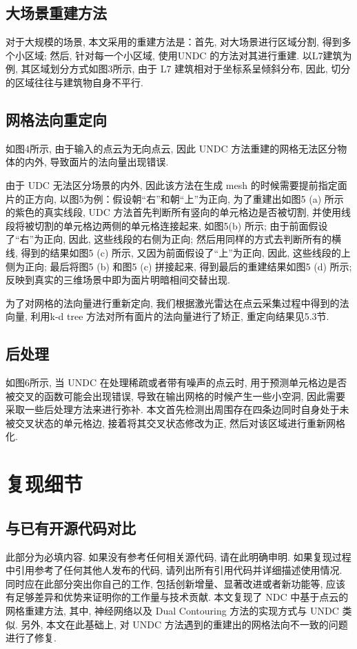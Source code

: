 \subsection{大场景重建方法}
对于大规模的场景, 本文采用的重建方法是：首先, 对大场景进行区域分割, 得到多个小区域; 然后, 针对每一个小区域, 使用UNDC 的方法对其进行重建. 以L7建筑为例, 其区域划分方式如图3所示, 由于 L7 建筑相对于坐标系呈倾斜分布, 因此, 切分的区域往往与建筑物自身不平行. 

\subsection{网格法向重定向}
如图4所示, 由于输入的点云为无向点云, 因此 UNDC 方法重建的网格无法区分物体的内外, 导致面片的法向量出现错误. 

由于 UDC 无法区分场景的内外, 因此该方法在生成 mesh 的时候需要提前指定面片的正方向, 以图5为例：假设朝“右”和朝“上”为正向, 为了重建出如图5 (a) 所示的紫色的真实线段, UDC 方法首先判断所有竖向的单元格边是否被切割, 并使用线段将被切割的单元格边两侧的单元格连接起来, 如图5(b) 所示; 由于前面假设了“右”为正向, 因此, 这些线段的右侧为正向; 然后用同样的方式去判断所有的横线, 得到的结果如图5 (c) 所示, 又因为前面假设了“上”为正向, 因此, 这些线段的上侧为正向; 最后将图5 (b) 和图5 (c) 拼接起来, 得到最后的重建结果如图5 (d) 所示; 反映到真实的三维场景中即为面片明暗相间交替出现. 

为了对网格的法向量进行重新定向, 我们根据激光雷达在点云采集过程中得到的法向量, 利用k-d tree 方法对所有面片的法向量进行了矫正, 重定向结果见5.3节. 

\subsection{后处理}
如图6所示, 当 UNDC 在处理稀疏或者带有噪声的点云时, 用于预测单元格边是否被交叉的函数可能会出现错误, 导致在输出网格的时候产生一些小空洞, 因此需要采取一些后处理方法来进行弥补. 本文首先检测出周围存在四条边同时自身处于未被交叉状态的单元格边, 接着将其交叉状态修改为正, 然后对该区域进行重新网格化. 

\section{复现细节}

\subsection{与已有开源代码对比}
此部分为必填内容. 如果没有参考任何相关源代码, 请在此明确申明. 如果复现过程中引用参考了任何其他人发布的代码, 请列出所有引用代码并详细描述使用情况. 同时应在此部分突出你自己的工作, 包括创新增量、显著改进或者新功能等, 应该有足够差异和优势来证明你的工作量与技术贡献. 
本文复现了 NDC 中基于点云的网格重建方法, 其中, 神经网络以及 Dual Contouring 方法的实现方式与 UNDC 类似. 另外, 本文在此基础上, 对 UNDC 方法遇到的重建出的网格法向不一致的问题进行了修复. 

